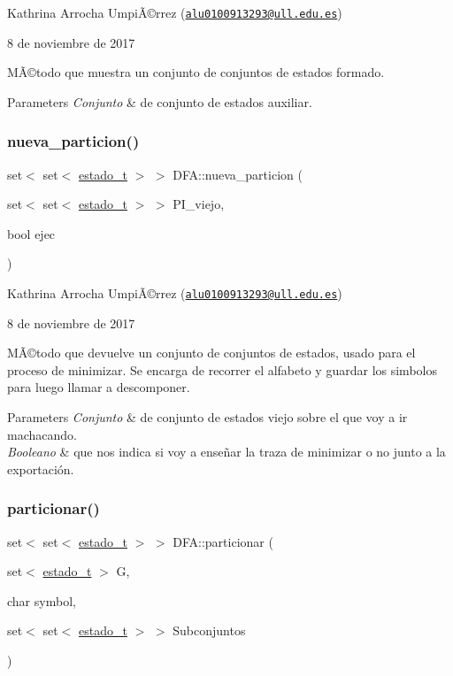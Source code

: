 Kathrina Arrocha UmpiÃ©rrez (\href{mailto:alu0100913293@ull.edu.es}{\tt alu0100913293@ull.\+edu.\+es})

8 de noviembre de 2017

MÃ©todo que muestra un conjunto de conjuntos de estados formado.


\begin{DoxyParams}{Parameters}
{\em Conjunto} & de conjunto de estados auxiliar. \\
\hline
\end{DoxyParams}
\mbox{\label{class_d_f_a_a427b050f652917a2ef10c6f0bcc62feb}} 
\subsubsection{\texorpdfstring{nueva\+\_\+particion()}{nueva\_particion()}}
{\footnotesize\ttfamily set$<$ set$<$ \hyperlink{classestado__t}{estado\+\_\+t} $>$ $>$ D\+F\+A\+::nueva\+\_\+particion (\begin{DoxyParamCaption}\item[{set$<$ set$<$ \hyperlink{classestado__t}{estado\+\_\+t} $>$ $>$}]{P\+I\+\_\+viejo,  }\item[{bool}]{ejec }\end{DoxyParamCaption})}

Kathrina Arrocha UmpiÃ©rrez (\href{mailto:alu0100913293@ull.edu.es}{\tt alu0100913293@ull.\+edu.\+es})

8 de noviembre de 2017

MÃ©todo que devuelve un conjunto de conjuntos de estados, usado para el proceso de minimizar. Se encarga de recorrer el alfabeto y guardar los simbolos para luego llamar a descomponer.


\begin{DoxyParams}{Parameters}
{\em Conjunto} & de conjunto de estados viejo sobre el que voy a ir machacando. \\
\hline
{\em Booleano} & que nos indica si voy a enseñar la traza de minimizar o no junto a la exportación. \\
\hline
\end{DoxyParams}
\mbox{\label{class_d_f_a_a228e7a01035c7ea79794111a0644b1a3}} 
\subsubsection{\texorpdfstring{particionar()}{particionar()}}
{\footnotesize\ttfamily set$<$ set$<$ \hyperlink{classestado__t}{estado\+\_\+t} $>$ $>$ D\+F\+A\+::particionar (\begin{DoxyParamCaption}\item[{set$<$ \hyperlink{classestado__t}{estado\+\_\+t} $>$}]{G,  }\item[{char}]{symbol,  }\item[{set$<$ set$<$ \hyperlink{classestado__t}{estado\+\_\+t} $>$ $>$}]{Subconjuntos }\end{DoxyParamCaption})}

